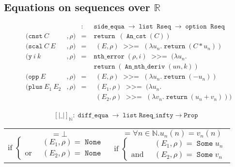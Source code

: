 \documentclass{article}
\newcommand{\Prop}{\texttt{Prop}}
\newcommand{\N}{\mathbb{N}}
\newcommand{\R}{\mathbb{R}}
\DeclareMathOperator{\None}{\mathtt{None}}
\DeclareMathOperator{\Some}{\mathtt{Some}}
\DeclareMathOperator{\return}{\mathtt{return}}
\DeclareMathOperator{\bind}{~\mathtt{>>=}~}
\DeclareMathOperator{\Rseq}{\mathtt{Rseq}}
\DeclareMathOperator{\ntherr}{\mathtt{nth\_error}}
\DeclareMathOperator{\option}{\mathtt{option}}
\DeclareMathOperator{\alist}{\mathtt{list}}
\DeclareMathOperator{\de}{\mathtt{diff\_equa}}
\DeclareMathOperator{\se}{\mathtt{side\_equa}}
\DeclareMathOperator{\Interp}{\mathtt{interp}}
\DeclareMathOperator{\Sem}{\left[\left| E_1 :=: E_2 \right|\right]}
\DeclareMathOperator{\SemN}{\Sem_{\N} \rho}
\DeclareMathOperator{\IN}{\Interp_{\N}}
\DeclareMathOperator{\C}{\mathtt{An\_cst}}
\DeclareMathOperator{\Dn}{\mathtt{An\_nth\_deriv}}
\begin{document}
\subsection{Equations on sequences over $\R$}

\label{interpN}
$$\begin{array}{lllcl}
\IN & & & : & \se \rightarrow \alist{} \Rseq \rightarrow \option{} \Rseq \\
\IN & (\mathtt{cnst}~ C & , \rho) & = & \return~ (\C{}(C))\\
\IN & (\mathtt{scal}~ C ~ E &, \rho) & = & \IN(E, \rho) \bind (\lambda u_n. \return (C * u_n))\\
\IN & (\mathtt{y} ~ i ~ k &, \rho) & = & \ntherr(\rho, i) \bind (\lambda u_n. \\
    & & &   & \return (\Dn{}(un,k)) \\
\IN & (\mathtt{opp} ~E &, \rho) & = & \IN(E,\rho) \bind (\lambda u_n. \return (- u_n))\\
\IN & (\mathtt{plus} ~ E_1 ~ E_2 &, \rho) & = & \IN(E_1,\rho) \bind (\lambda u_n.\\
    & & &   & \IN(E_2,\rho) \bind (\lambda v_n. \return (u_n + v_n)))\\
\end{array}$$

$$\left[\left| \_ \right|\right]_{\N} : \de \rightarrow \alist{}
\mathtt{Rseq\_infty} \rightarrow \Prop$$

\begin{center}
\begin{tabular}{c|c}
\begin{minipage}{0.45\textwidth}
$$\SemN{} = \bot$$
$$\text{if } \left\lbrace
\begin{array}{ll}
& \IN(E_1, \rho) = \None\\
\text{or} & \IN(E_2, \rho) = \None
\end{array}\right.$$
\end{minipage}

& \begin{minipage}{0.45\textwidth}
$$\SemN{} = \forall n \in \N. u_n(n) = v_n(n)$$
$$\text{if } \left\lbrace
\begin{array}{ll}
& \IN(E_1, \rho) = \Some u_n\\
\text{and} & \IN(E_2, \rho) = \Some v_n
\end{array}\right.$$
\end{minipage}

\end{tabular}
\end{center}
\end{document}
